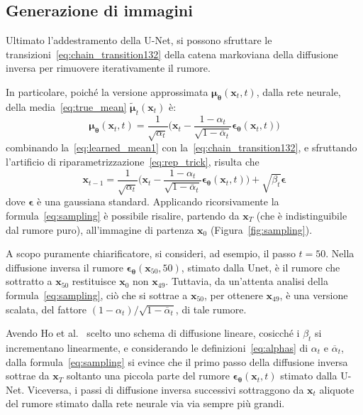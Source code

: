 \subsection{Generazione di immagini}

Ultimato l'addestramento della U-Net, si possono sfruttare le transizioni~\eqref{eq:chain_transition132} della catena markoviana 
della diffusione inversa per rimuovere iterativamente il rumore.

In particolare, poiché la versione approssimata $\bm{\mu}_{\bm{\theta}}(\mathbf{x}_t,t)$, dalla rete neurale,
della media~\eqref{eq:true_mean} $\tilde{\bm{\mu}}_t(\mathbf{x}_t)$ è:
\begin{equation}
  \bm{\mu}_{\bm{\theta}}(\mathbf{x}_t,t)=\frac{1}{\sqrt{\alpha_t}}\biggl(\mathbf{x}_t-\frac{1-\alpha_t}{\sqrt{1-\overline{\alpha}_t}}\bm{\epsilon}_{\bm{\theta}}(\mathbf{x}_t,t)\biggr)\label{eq:learned_mean1}
\end{equation}
combinando la~\eqref{eq:learned_mean1} con la~\eqref{eq:chain_transition132}, e sfruttando l'artificio di riparametrizzazione~\eqref{eq:rep_trick}, risulta che 
\begin{equation}
  \mathbf{x}_{t-1}=\frac{1}{\sqrt{\alpha_t}}\biggl(\mathbf{x}_t-\frac{1-\alpha_t}{\sqrt{1-\overline{\alpha}_t}}\bm{\epsilon}_{\bm{\theta}}(\mathbf{x}_t,t)\biggr)+
  \sqrt{\beta_t}\bm{\epsilon} \label{eq:sampling}
\end{equation}
dove $\bm{\epsilon}$ è una gaussiana standard. 
Applicando ricorsivamente la formula~\eqref{eq:sampling} è possibile risalire, partendo da $\mathbf{x}_T$ 
(che è indistinguibile dal rumore puro), all'immagine di partenza $\mathbf{x}_0$ (Figura~\ref{fig:sampling}).

\medskip
\begin{oss}
A scopo puramente chiarificatore, si consideri, ad esempio, il passo $t=50$. 
Nella diffusione inversa il rumore $\bm{\epsilon}_{\bm{\theta}}(\mathbf{x}_{50},50)$, stimato dalla Unet, 
è il rumore che sottratto a $\mathbf{x}_{50}$ restituisce $\mathbf{x}_0$ non $\mathbf{x}_{49}$. 
Tuttavia, da un'attenta analisi della formula~\eqref{eq:sampling}, 
ciò che si sottrae a $\mathbf{x}_{50}$, per ottenere $\mathbf{x}_{49}$, è una versione scalata, 
del fattore $(1-\alpha_t)/\sqrt{1-\overline{\alpha}_t}$, di tale rumore.
\end{oss}

\smallskip
\begin{oss}
Avendo Ho et al.~\cite{ho2020} scelto uno schema di diffusione lineare, cosicché i $\beta_t$ si incrementano linearmente, 
e considerando le definizioni~\eqref{eq:alphas} di $\alpha_t$ e $\overline{\alpha}_t$, dalla formula~\eqref{eq:sampling} si evince che 
il primo passo della diffusione inversa sottrae da $\mathbf{x}_T$ soltanto una piccola parte del rumore $\bm{\epsilon}_{\bm{\theta}}(\mathbf{x}_t,t)$ stimato dalla U-Net.
Viceversa, i passi di diffusione inversa successivi sottraggono da $\mathbf{x}_t$ aliquote del rumore stimato dalla rete neurale via via sempre più grandi.
\end{oss}


